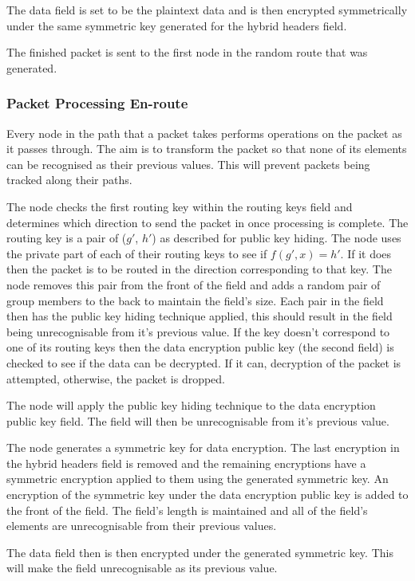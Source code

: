 \documentclass[ %
                    author={Luke Murray},
                supervisor={Dr. Simon Hollis},
                     title={Shadow Peer-to-Peer Networks},
                  subtitle={},
                    degree={MEng},
                      year={2013} ]{thesis}
\begin{document}
The data field is set to be the plaintext data and is then encrypted symmetrically under the same symmetric key generated for the hybrid headers field.

The finished packet is sent to the first node in the random route that was generated.

\subsubsection{Packet Processing En-route}

Every node in the path that a packet takes performs operations on the packet as it passes through. The aim is to transform the packet so that none of its elements can be recognised as their previous values. This will prevent packets being tracked along their paths.

The node checks the first routing key within the routing keys field and determines which direction to send the packet in once processing is complete. The routing key is a pair of ($g\prime$, $h\prime$) as described for public key hiding. The node uses the private part of each of their routing keys to see if $f(g\prime, x) = h\prime$. If it does then the packet is to be routed in the direction corresponding to that key. The node removes this pair from the front of the field and adds a random pair of group members to the back to maintain the field's size. Each pair in the field then has the public key hiding technique applied, this should result in the field being unrecognisable from it's previous value. If the key doesn't correspond to one of its routing keys then the data encryption public key (the second field) is checked to see if the data can be decrypted. If it can, decryption of the packet is attempted, otherwise, the packet is dropped.

The node will apply the public key hiding technique to the data encryption public key field. The field will then be unrecognisable from it's previous value.

The node generates a symmetric key for data encryption. The last encryption in the hybrid headers field is removed and the remaining encryptions have a symmetric encryption applied to them using the generated symmetric key. An encryption of the symmetric key under the data encryption public key is added to the front of the field. The field's length is maintained and all of the field's elements are unrecognisable from their previous values.

The data field then is then encrypted under the generated symmetric key. This will make the field unrecognisable as its previous value. %
\end{document}
